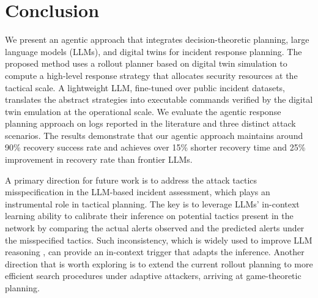 \documentclass[sigconf]{acmart}
\begin{document}
\section{Conclusion}
We present an agentic approach that integrates decision-theoretic planning, large language models (LLMs), and digital twins for incident response planning. The proposed method uses a rollout planner based on digital twin simulation to compute a high-level response strategy that allocates security resources at the tactical scale. A lightweight LLM, fine-tuned over public incident datasets, translates the abstract strategies into executable commands verified by the digital twin emulation at the operational scale. We evaluate the agentic response planning approach on logs reported in the literature and three distinct attack scenarios. The results demonstrate that our agentic approach maintains around 90\% recovery success rate and achieves over 15\% shorter recovery time and 25\% improvement in recovery rate than frontier LLMs.

A primary direction for future work is to address the attack tactics misspecification in the LLM-based incident assessment, which plays an instrumental role in tactical planning. The key is to leverage LLMs' in-context learning ability to calibrate their inference on potential tactics present in the network by comparing the actual alerts observed and the predicted alerts under the misspecified tactics. Such inconsistency, which is widely used to improve LLM reasoning \cite{wang2023selfconsistency}, can provide an in-context trigger that adapts the inference. Another direction that is worth exploring is to extend the current rollout planning to more efficient search procedures under adaptive attackers, arriving at game-theoretic planning. 







\clearpage
\appendix
\end{document}
